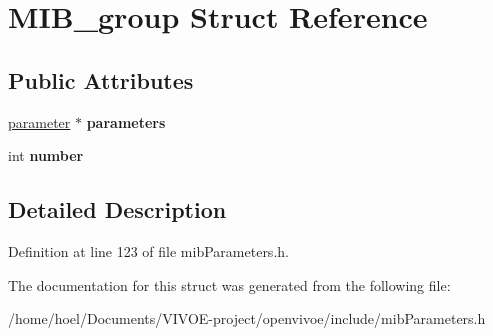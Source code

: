 \hypertarget{structMIB__group}{}\section{M\+I\+B\+\_\+group Struct Reference}
\label{structMIB__group}
\subsection*{Public Attributes}
\begin{DoxyCompactItemize}
\item 
\hyperlink{structparameter}{parameter} $\ast$ {\bfseries parameters}\hypertarget{structMIB__group_a8af68ecc63188d1375a7f53869f58e32}{}\label{structMIB__group_a8af68ecc63188d1375a7f53869f58e32}

\item 
int {\bfseries number}\hypertarget{structMIB__group_af1dd91593a6a4d9c9388911614c98d7c}{}\label{structMIB__group_af1dd91593a6a4d9c9388911614c98d7c}

\end{DoxyCompactItemize}


\subsection{Detailed Description}


Definition at line 123 of file mib\+Parameters.\+h.



The documentation for this struct was generated from the following file\+:\begin{DoxyCompactItemize}
\item 
/home/hoel/\+Documents/\+V\+I\+V\+O\+E-\/project/openvivoe/include/mib\+Parameters.\+h\end{DoxyCompactItemize}
